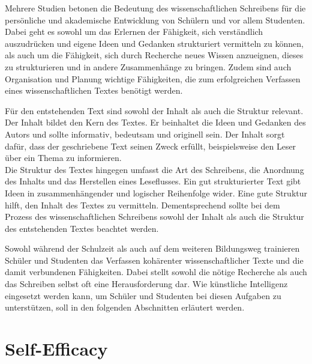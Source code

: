 \documentclass[../main.tex]{subfiles}
\begin{document}
Mehrere Studien betonen die Bedeutung des wissenschaftlichen Schreibens für die persönliche und akademische Entwicklung 
von Schülern und vor allem Studenten\cite{influencingUsingAi,ZukunftWissenschaftlichesPublizieren}. Dabei geht es sowohl um das Erlernen der Fähigkeit, sich verständlich auszudrücken und 
eigene Ideen und Gedanken strukturiert vermitteln zu können, als auch um die Fähigkeit, sich durch Recherche neues Wissen 
anzueignen, dieses zu strukturieren und in andere Zusammenhänge zu bringen. Zudem sind auch Organisation und Planung 
wichtige Fähigkeiten, die zum erfolgreichen Verfassen eines wissenschaftlichen Textes benötigt werden. 

Für den entstehenden Text sind sowohl der Inhalt als auch die Struktur relevant. Der Inhalt bildet den Kern des Textes. Er beinhaltet die Ideen und Gedanken des Autors und sollte 
informativ, bedeutsam und originell sein. Der Inhalt sorgt dafür, dass der geschriebene Text seinen Zweck erfüllt, beispielsweise 
den Leser über ein Thema zu informieren. \\
Die Struktur des Textes hingegen umfasst die Art des Schreibens, die Anordnung des Inhalts und das Herstellen eines Leseflusses. 
Ein gut strukturierter Text gibt Ideen in zusammenhängender und logischer Reihenfolge wider. Eine gute Struktur hilft, den Inhalt des
Textes zu vermitteln. Dementsprechend sollte bei dem Prozess des wissenschaftlichen Schreibens sowohl der Inhalt als auch die Struktur des entstehenden 
Textes beachtet werden.\cite{teachers}

Sowohl während der Schulzeit als auch auf dem weiteren Bildungsweg trainieren Schüler und Studenten das Verfassen kohärenter 
wissenschaftlicher Texte und die damit verbundenen Fähigkeiten. Dabei stellt sowohl die nötige Recherche als auch das Schreiben selbst
oft eine Herausforderung dar. Wie künstliche Intelligenz eingesetzt werden kann, um Schüler und Studenten bei diesen Aufgaben zu 
unterstützen, soll in den folgenden Abschnitten erläutert werden. 

\section{Self-Efficacy}
\end{document}
